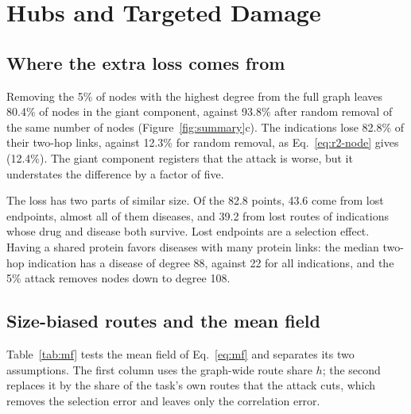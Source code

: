 \section{Hubs and Targeted Damage}
\label{sec:hubs}

\subsection{Where the extra loss comes from}
\label{sec:hubs-loss}

Removing the 5\% of nodes with the highest degree from the full graph leaves
80.4\% of nodes in the giant component, against 93.8\% after random removal of
the same number of nodes (Figure~\ref{fig:summary}c). The indications lose 82.8\% of
their two-hop links, against 12.3\% for random removal, as Eq.~\eqref{eq:r2-node}
gives (12.4\%). The giant component registers that the attack is worse, but
it understates the difference by a factor of five.

The loss has two parts of similar size. Of the 82.8 points, 43.6 come from lost
endpoints, almost all of them diseases, and 39.2 from lost routes of
indications whose drug and disease both survive. Lost endpoints are a selection
effect. Having a shared protein favors diseases with many protein links: the
median two-hop indication has a disease of degree 88, against 22 for all
indications, and the 5\% attack removes nodes down to degree 108.

\subsection{Size-biased routes and the mean field}
\label{sec:hubs-mf}

Table~\ref{tab:mf} tests the mean field of Eq.~\eqref{eq:mf} and separates its
two assumptions. The first column uses the graph-wide route share $h$; the
second replaces it by the share of the task's own routes that the attack cuts,
which removes the selection error and leaves only the correlation error.

